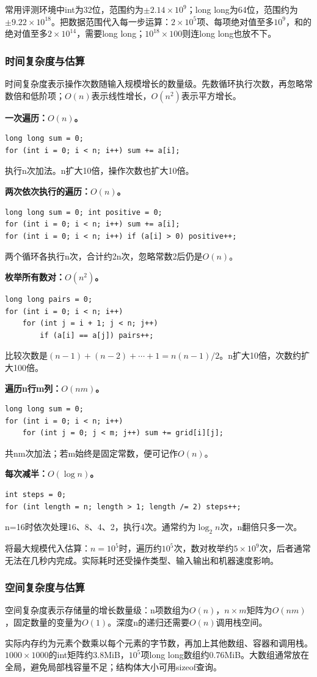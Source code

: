 常用评测环境中int为32位，范围约为$\pm2.14\times10^9$；long long为64位，范围约为$\pm9.22\times10^{18}$。把数据范围代入每一步运算：$2\times10^5$项、每项绝对值至多$10^9$，和的绝对值至多$2\times10^{14}$，需要long long；$10^{18}\times100$则连long long也放不下。
\subsubsection{时间复杂度与估算}
时间复杂度表示操作次数随输入规模增长的数量级。先数循环执行次数，再忽略常数倍和低阶项；$O(n)$表示线性增长，$O(n^2)$表示平方增长。

\textbf{一次遍历：$O(n)$。}
\begin{lstlisting}
long long sum = 0;
for (int i = 0; i < n; i++) sum += a[i];
\end{lstlisting}
执行n次加法。n扩大10倍，操作次数也扩大10倍。

\textbf{两次依次执行的遍历：$O(n)$。}
\begin{lstlisting}
long long sum = 0; int positive = 0;
for (int i = 0; i < n; i++) sum += a[i];
for (int i = 0; i < n; i++) if (a[i] > 0) positive++;
\end{lstlisting}
两个循环各执行n次，合计约2n次，忽略常数2后仍是$O(n)$。

\textbf{枚举所有数对：$O(n^2)$。}
\begin{lstlisting}
long long pairs = 0;
for (int i = 0; i < n; i++)
    for (int j = i + 1; j < n; j++)
        if (a[i] == a[j]) pairs++;
\end{lstlisting}
比较次数是$(n-1)+(n-2)+\cdots+1=n(n-1)/2$。n扩大10倍，次数约扩大100倍。

\textbf{遍历n行m列：$O(nm)$。}
\begin{lstlisting}
long long sum = 0;
for (int i = 0; i < n; i++)
    for (int j = 0; j < m; j++) sum += grid[i][j];
\end{lstlisting}
共nm次加法；若m始终是固定常数，便可记作$O(n)$。

\textbf{每次减半：$O(\log n)$。}
\begin{lstlisting}
int steps = 0;
for (int length = n; length > 1; length /= 2) steps++;
\end{lstlisting}
n=16时依次处理16、8、4、2，执行4次。通常约为$\log_2 n$次，n翻倍只多一次。

将最大规模代入估算：$n=10^5$时，遍历约$10^5$次，数对枚举约$5\times10^9$次，后者通常无法在几秒内完成。实际耗时还受操作类型、输入输出和机器速度影响。
\subsubsection{空间复杂度与估算}
空间复杂度表示存储量的增长数量级：n项数组为$O(n)$，$n\times m$矩阵为$O(nm)$，固定数量的变量为$O(1)$。深度n的递归还需要$O(n)$调用栈空间。

实际内存约为元素个数乘以每个元素的字节数，再加上其他数组、容器和调用栈。$1000\times1000$的int矩阵约3.8MiB，$10^5$项long long数组约0.76MiB。大数组通常放在全局，避免局部栈容量不足；结构体大小可用sizeof查询。
